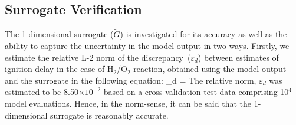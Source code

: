 \subsection{Surrogate Verification}
\label{sub:verify}

The 1-dimensional surrogate ($\tilde{G}$) is investigated for its accuracy as well as the ability to capture the 
uncertainty in the
model output in two ways. Firstly, we estimate the relative L-2 norm of the discrepancy~($\varepsilon_d$)
between estimates of ignition delay in the case of H$_2$/O$_2$ reaction, obtained using the 
model output and the surrogate in the following equation:
%
\be
\varepsilon_d = 
\ee
%
The relative norm, $\varepsilon_d$ was estimated to be 8.50$\times10^{-2}$ based on a cross-validation test data
comprising 10$^{4}$ model evaluations. Hence, in the norm-sense, it can be said that the 1-dimensional surrogate is 
reasonably accurate. 


